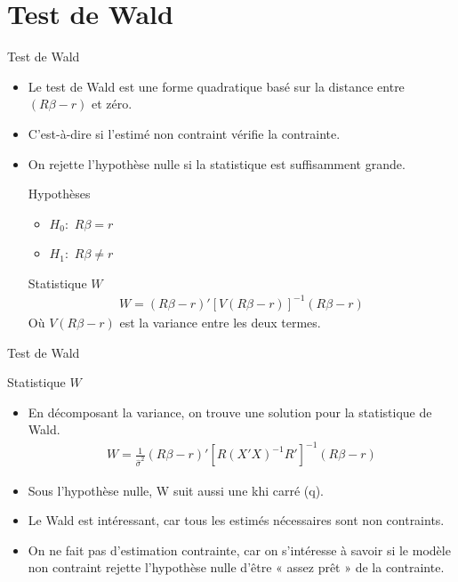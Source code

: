 \documentclass{beamer}
\begin{document}
\section{Test de Wald}

\frame{\tableofcontents[current]}

\begin{frame}{Test de Wald}
\begin{itemize}
\item Le test de Wald est une forme quadratique basé sur la distance entre $(R \beta -r)$ et zéro.
\item C’est-à-dire si l’estimé non contraint vérifie la contrainte.
\item On rejette l’hypothèse nulle si la statistique est suffisamment grande.
\begin{block}{Hypothèses}
\begin{itemize}
\item $H_0:$ $R \beta = r$
\item $H_1:$ $R \beta \neq r$
\end{itemize}
\end{block}
\begin{block}{Statistique $W$}
\begin{align*}
W=(R \beta -r)'[V(R \beta -r)]^{-1}(R \beta-r)
\end{align*}
Où $V(R \beta -r)$ est la variance entre les deux termes.
\end{block}
\end{itemize}
\end{frame}

\begin{frame}{Test de Wald}
\begin{block}{Statistique $W$}
\begin{itemize}
\item En décomposant la variance, on trouve une solution pour la statistique de Wald.
\begin{align*}
W = \frac{1}{\hat{\sigma}^2}(R \beta -r)'[R(X'X)^{-1}R']^{-1}(R \beta -r)
\end{align*}
\end{itemize}
\end{block}
\begin{itemize}
\item Sous l’hypothèse nulle, W suit aussi une khi carré (q).
\item Le Wald est intéressant, car tous les estimés nécessaires sont non contraints.
\item On ne fait pas d’estimation contrainte, car on s’intéresse à savoir si le modèle non contraint rejette l’hypothèse nulle d’être « assez prêt » de la contrainte.
\end{itemize}
\end{frame}
\end{document}
